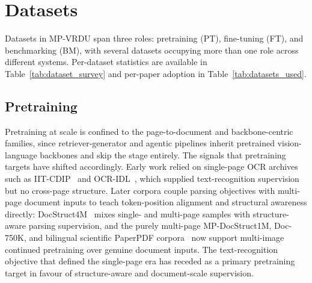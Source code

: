 \documentclass[11pt]{article}
\begin{document}

\section{Datasets}
\label{sec:datasets}
Datasets in MP-VRDU span three roles: pretraining (PT), fine-tuning (FT), and benchmarking (BM), with several datasets occupying more than one role across different systems. Per-dataset statistics are available in Table~\ref{tab:dataset_survey} and per-paper adoption in Table~\ref{tab:datasets_used}.

\subsection{Pretraining}
\label{sec:data-pt}
Pretraining at scale is confined to the page-to-document and backbone-centric families, since retriever-generator and agentic pipelines inherit pretrained vision-language backbones and skip the stage entirely. The signals that pretraining targets have shifted accordingly. Early work relied on single-page OCR archives such as IIT-CDIP~\cite{lewis2006iitcdip} and OCR-IDL~\cite{biten2022ocridl}, which supplied text-recognition supervision but no cross-page structure. Later corpora couple parsing objectives with multi-page document inputs to teach token-position alignment and structural awareness directly: DocStruct4M~\cite{hu2024mplug} mixes single- and multi-page samples with structure-aware parsing supervision, and the purely multi-page MP-DocStruct1M, Doc-750K, and bilingual scientific PaperPDF corpora~\cite{hu2025mplug2,duan2025docopilot,xie2024wukong} now support multi-image continued pretraining over genuine document inputs. The text-recognition objective that defined the single-page era has receded as a primary pretraining target in favour of structure-aware and document-scale supervision.
\end{document}

